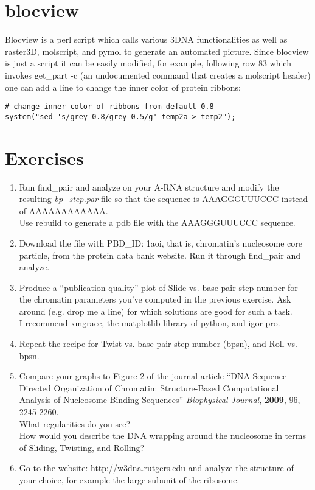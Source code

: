 \documentclass[10pt, oneside, pdftex]{article}
\begin{document}
\section{blocview}
Blocview is a perl script  which calls various 3DNA functionalities as
well  as  raster3D, molscript,  and  pymol  to  generate an  automated
picture. Since  blocview is just a  script it can  be easily modified,
for example, following row 83 which invokes get\_part -c (an
undocumented command that creates a molscript header) one  can add a
line to change the inner color of protein ribbons:
\begin{Verbatim}
# change inner color of ribbons from default 0.8
system("sed 's/grey 0.8/grey 0.5/g' temp2a > temp2");
\end{Verbatim}

\section{Exercises}
\begin{enumerate}
\item{Run   \textrm{find\_pair}  and  \textrm{analyze}   on  your  A-RNA
structure and modify the  resulting \textit{bp\_step.par} file so that
the sequence is AAAGGGUUUCCC instead of AAAAAAAAAAAA.\\
Use rebuild to generate a pdb file with the AAAGGGUUUCCC sequence.}
\item{Download the file with PBD\_ID: 1aoi, that is, chromatin's
nucleosome core particle,  from the protein data bank  website. Run it
through \textrm{find\_pair} and \textrm{analyze}.}
\item{Produce a  ``publication quality''  plot of Slide  vs. base-pair
    step number  for the chromatin  parameters you've computed  in the
    previous exercise.  Ask around (e.g.  drop me a line) for which solutions
    are  good  for  such  a  task.\\ I  recommend  \textrm{xmgrace},  the
   \textrm{matplotlib} library of \textrm{python}, and  \textrm{igor-pro}.}
\item{Repeat the recipe for Twist vs. base-pair step number (bpsn), and Roll
    vs. bpsn.}
\item{Compare your  graphs to  Figure 2 of  the journal  article ``DNA
    Sequence-Directed   Organization  of   Chromatin:  Structure-Based
    Computational    Analysis   of    Nucleosome-Binding   Sequences''
    \textit{Biophysical Journal}, \textbf{2009}, 96, 2245-2260.\\  What
    regularities do  you see?\\  How would you  describe the  DNA wrapping
    around the nucleosome in terms of Sliding, Twisting, and Rolling?}
\item{Go  to the  website: \url{http://w3dna.rutgers.edu}  and analyze
    the structure of your choice, for example the large subunit of the
  ribosome.}
\end{enumerate}
\end{document}
